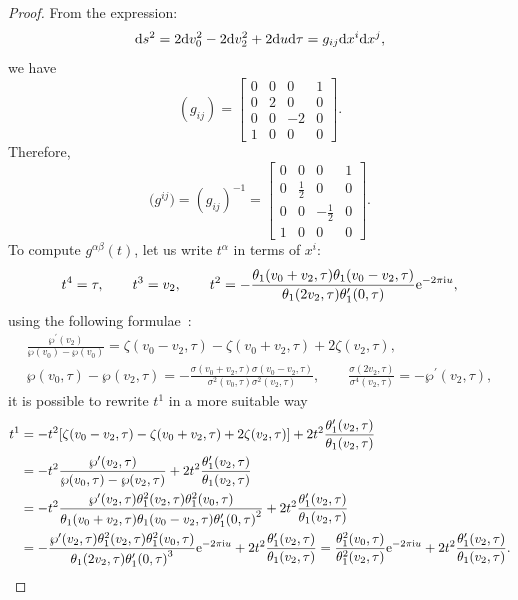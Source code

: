 \documentclass[10pt,a4paper]{amsart}
\numberwithin{equation}{section}
\begin{document}
\begin{proof}
 From the expression:
\begin{gather*}
{\rm d}s^2=2{\rm d}v_0^2-2{\rm d}v_2^2+2{\rm d}u {\rm d}\tau=g_{ij}{\rm d}x^i{\rm d}x^j,
\end{gather*}
we have
\[
(g_{ij})=
\begin{bmatrix}
 0 & 0 & 0 &1 \\
 0 & 2 &0 &0 \\
 0& 0 & -2 & 0 \\
 1 & 0 & 0 &0
\end{bmatrix}.
\]
Therefore,
\[
\big(g^{ij}\big)=(g_{ij})^{-1}=
\begin{bmatrix}
 0 & 0 & 0 &1 \\
 0 & \frac{1}{2} &0 &0 \\
 0& 0 & -\frac{1}{2} & 0 \\
 1 & 0 & 0 &0
\end{bmatrix}.
\]
To compute $g^{\alpha\beta}(t)$, let us write $t^{\alpha}$ in terms of $x^i$:
\begin{gather*}
t^4=\tau,\qquad t^3=v_2,\qquad
t^2=-\frac{\theta_1(v_0+v_2,\tau)\theta_1(v_0-v_2,\tau)} {\theta_1(2v_2,\tau)\theta_1^{\prime}(0,\tau)}{\rm e}^{-2\pi {\rm i} u},
\end{gather*}
using the following formulae~\cite{E.T.WhittakerandG.N.Watson}:
\begin{gather*}
\frac{\wp^{\prime}(v_2)}{\wp(v_0)-\wp(v_0)}=\zeta(v_0-v_2,\tau)-\zeta(v_0+v_{2},\tau)+2\zeta(v_2,\tau),
\\
\wp(v_0,\tau)-\wp(v_2,\tau)=-\frac{\sigma(v_0+v_2,\tau)\sigma(v_0-v_2,\tau)} {\sigma^2(v_0,\tau)\sigma^2(v_2,\tau)},
\qquad
\frac{\sigma(2v_2,\tau)}{\sigma^4(v_2,\tau)}=-\wp^{\prime}(v_2,\tau),
\end{gather*}
it is possible to rewrite $t^1$ in a more suitable way
\begin{align*}
t^1&=-t^2[\zeta(v_0-v_2,\tau)-\zeta(v_0+v_{2},\tau)+2\zeta(v_2,\tau)] +2t^2\frac{\theta_1^{\prime}(v_2,\tau)}{\theta_1(v_2,\tau)}
\\
&=-t^2\frac{\wp^{\prime}(v_2,\tau)}{\wp(v_0,\tau)-\wp(v_2,\tau)} +2t^2\frac{\theta_1^{\prime}(v_2,\tau)}{\theta_1(v_2,\tau)}
\\
&=-t^2\frac{\wp^{\prime}(v_2,\tau)\theta_1^2(v_2,\tau)\theta_1^2(v_0,\tau)} {\theta_1(v_0+v_2,\tau)\theta_1(v_0-v_2,\tau){\theta_1^{\prime}(0,\tau)}^2} +2t^2\frac{\theta_1^{\prime}(v_2,\tau)}{\theta_1(v_2,\tau)}
\\
&=-\frac{\wp^{\prime}(v_2,\tau)\theta_1^2(v_2,\tau)\theta_1^2(v_0,\tau)} {\theta_1(2v_2,\tau){\theta_1^{\prime}(0,\tau)}^3}{\rm e}^{-2\pi {\rm i} u}+2t^2\frac{\theta_1^{\prime}(v_2,\tau)}{\theta_1(v_2,\tau)}
=\frac{\theta_1^2(v_0,\tau)}{\theta_1^2(v_2,\tau)}{\rm e}^{-2\pi {\rm i} u}+2t^2\frac{\theta_1^{\prime}(v_2,\tau)}{\theta_1(v_2,\tau)}.
\end{align*}


\end{proof}
\end{document}
